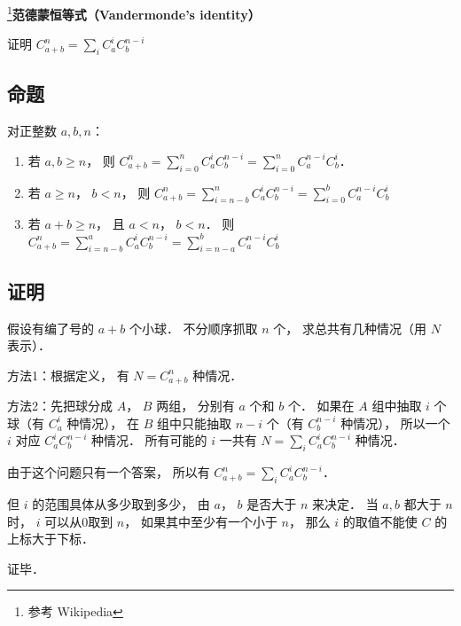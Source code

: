 

\footnote{参考 Wikipedia }\textbf{范德蒙恒等式（Vandermonde's identity）}

证明 $C_{a + b}^n = \sum_i C_a^i C_b^{n - i}$ 

\subsection{命题}
对正整数 $a,b,n$：
\begin{enumerate}
\item 若 $a,b \geqslant n$，  则 $C_{a + b}^n = \sum\limits_{i = 0}^n C_a^iC_b^{n - i}  = \sum\limits_{i = 0}^n C_a^{n - i} C_b^i$． 
\item 若 $a \geqslant n$，  $b < n$，   则  $C_{a + b}^n = \sum\limits_{i = n - b}^n C_a^iC_b^{n - i}  = \sum\limits_{i = 0}^b C_a^{n - i} C_b^i$ 
\item 若 $a + b \geqslant n$，   且 $a < n$，   $b < n$．  则  $C_{a + b}^n = \sum\limits_{i = n - b}^a C_a^i C_b^{n - i}  = \sum\limits_{i = n - a}^b C_a^{n - i} C_b^i$ 
\end{enumerate}

\subsection{证明}

假设有编了号的 $a+b$ 个小球． 不分顺序抓取 $n$ 个， 求总共有几种情况（用 $N$ 表示）．

方法1：根据定义， 有 $N = C_{a + b}^n$ 种情况．

方法2：先把球分成 $A$，  $B$ 两组， 分别有 $a$ 个和 $b$ 个． 如果在 $A$ 组中抽取 $i$ 个球（有 $C_a^i$ 种情况）， 在 $B$ 组中只能抽取  $n - i$ 个（有 $C_b^{n - i}$ 种情况）， 所以一个 $i$ 对应 $C_a^i C_b^{n - i}$ 种情况． 所有可能的 $i$ 一共有 $N = \sum_i C_a^i C_b^{n - i}$ 种情况．

由于这个问题只有一个答案， 所以有 $C_{a + b}^n = \sum_i C_a^i C_b^{n - i}$． 

但 $i$ 的范围具体从多少取到多少， 由 $a$，  $b$ 是否大于 $n$ 来决定． 当 $a,b$ 都大于 $n$ 时， $i$ 可以从0取到 $n$，  如果其中至少有一个小于 $n$，  那么 $i$ 的取值不能使 $C$ 的上标大于下标．

证毕．

